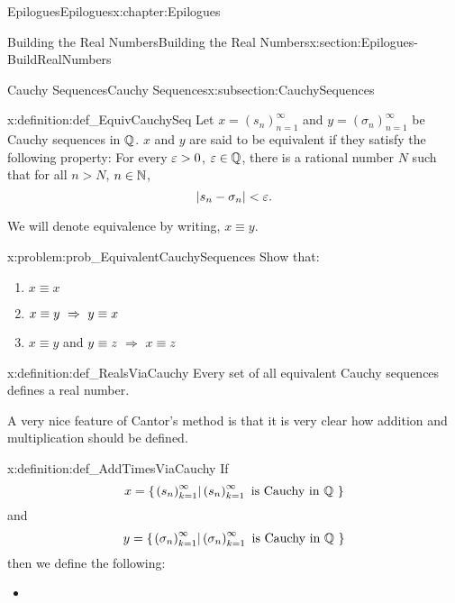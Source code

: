\begin{chapterptx}{Epilogues}{}{Epilogues}{}{}{x:chapter:Epilogues}
\begin{sectionptx}{Building the Real Numbers}{}{Building the Real Numbers}{}{}{x:section:Epilogues-BuildRealNumbers}
\begin{subsectionptx}{Cauchy Sequences}{}{Cauchy Sequences}{}{}{x:subsection:CauchySequences}
\begin{definition}{}{x:definition:def_EquivCauchySeq}
				 Let \(x=\left(s_n\right)_{n=1}^\infty\) and \(y=\left(\sigma_n\right)_{n=1}^\infty\) be Cauchy sequences in \(\mathbb {Q}\). \(x\) and \(y\) are said to be equivalent if they satisfy the following property: For every \(\varepsilon>0\), \(\varepsilon\in\mathbb {Q}\), there is a rational number \(N\) such that for all \(n>N\), \(n\in\mathbb {N}\),%
				\begin{equation*}
					\left|s_n-\sigma_n\right|< \varepsilon\text{.}
				\end{equation*}
				\par
				We will denote equivalence by writing, \(x\equiv y\).%
			\end{definition}
			\begin{problem}{}{x:problem:prob_EquivalentCauchySequences}%
				Show that:%
				\begin{enumerate}[font=\bfseries,label=(\alph*),ref=\alph*]
					\item{}\(x\equiv x\)%
					\item{}\(x\equiv y \ \Rightarrow\  y\equiv x\)%
					\item{}\(x\equiv y\) and \(y\equiv z \ \Rightarrow\  x\equiv z\)%
				\end{enumerate}
			\end{problem}
			\begin{definition}{}{x:definition:def_RealsViaCauchy}%
				 Every set of all equivalent Cauchy sequences defines a real number.%
			\end{definition}
			A very nice feature of Cantor's method is that it is very clear how addition and multiplication should be defined.%
			\begin{definition}{}{x:definition:def_AddTimesViaCauchy}%
				 If%
				\begin{equation*}
					x= \left\{\left.\left(s_n\right)_{k=1}^\infty \right| \left(s_n\right)_{k=1}^\infty \text{ is Cauchy in \(\mathbb {Q}\) } \right\}
				\end{equation*}
				and%
				\begin{equation*}
					y= \left\{\left.\left(\sigma_n\right)_{k=1}^\infty \right| \left(\sigma_n\right)_{k=1}^\infty \text{ is Cauchy in \(\mathbb {Q}\) } \right\}
				\end{equation*}
				then we define the following:%
				\begin{itemize}[label=\textbullet]
					\item{}\par%

\end{itemize}
\end{definition}
\end{subsectionptx}
\end{sectionptx}
\end{chapterptx}
